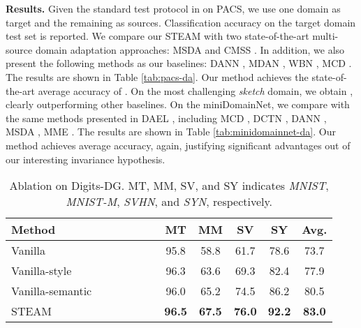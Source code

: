 \documentclass[10pt,twocolumn,letterpaper]{article}
\newcommand{\0}{{\bf 0}}
\begin{document}
\textbf{Results.} Given the standard test protocol in \cite{peng2019moment} on PACS, we use one domain as target and the remaining as sources. Classification accuracy on the target domain test set is reported. We compare our STEAM with two state-of-the-art multi-source domain adaptation approaches: MSDA \cite{peng2019moment} and CMSS \cite{yang2020curriculum}. In addition, we also present the following methods as our baselines: DANN \cite{ganin2015unsupervised}, MDAN \cite{zhao2018adversarial}, WBN \cite{mancini2018boosting}, MCD \cite{saito2018maximum}. The results are shown in Table \ref{tab:pacs-da}. Our method achieves the state-of-the-art average accuracy of . On the most challenging \textit{sketch} domain, we obtain , clearly outperforming other baselines. On the miniDomainNet, we compare with the same methods presented in DAEL \cite{zhou2020domain}, including MCD \cite{saito2018maximum}, DCTN \cite{xu2018deep}, DANN \cite{ganin2015unsupervised}, MSDA \cite{peng2019moment}, MME \cite{saito2019semi}. The results are shown in Table \ref{tab:minidomainnet-da}. Our method achieves  average accuracy, again, justifying significant advantages out of our interesting invariance hypothesis.

\begin{table}[t]
\center
\scriptsize
\setlength{\tabcolsep}{4pt}
\renewcommand{\arraystretch}{1.4}
\caption{Ablation on Digits-DG. MT, MM, SV, and SY indicates \textit{MNIST}, \textit{MNIST-M}, \textit{SVHN}, and \textit{SYN}, respectively.}
\vspace{0.2cm}
\begin{tabular}{l | c c c c  |c c c c | c}
\hline

Method & & & & & MT & MM & SV & SY & Avg. \\ \hline
Vanilla & &~ &~ &~ & 95.8 & 58.8 & 61.7 & 78.6 & 73.7 \\
Vanilla-style & & & &~ & 96.3 & 63.6 & 69.3 & 82.4 & 77.9 \\
Vanilla-semantic & &~ &~ & & 96.0 & 65.2 & 74.5 & 86.2 & 80.5 \\
\hline
STEAM & & & & & \textbf{96.5} & \textbf{67.5} & \textbf{76.0} & \textbf{92.2} & \textbf{83.0} \\
\hline
\end{tabular}
\vspace{-0.18in}
\label{tab:ablation-digits-dg}
\end{table}
\end{document}
